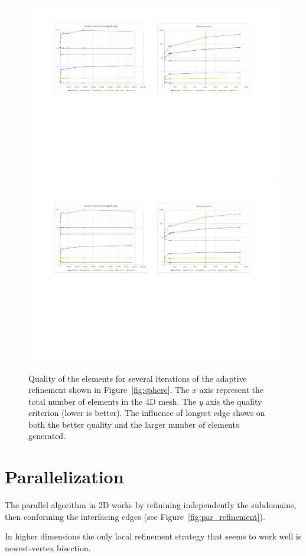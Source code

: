 \documentclass{article}
\begin{document}
\begin{figure}[htbp]
	\centering
	\includegraphics[width=0.48\linewidth]{figures/NewestVertex_Recursive} \hfill
	\includegraphics[width=0.48\linewidth]{figures/NewestVertex_and_LongestEdge_Recursive} 

	\caption{Quality of the elements for several iterations of the adaptive refinement shown in Figure~\ref{fig:sphere}. The $x$ axis represent the total number of elements in the 4D mesh. The $y$ axis the quality criterion (lower is better). The influence of longest edge shows on both the better quality and the larger number of elements generated.}
	\label{fig:quality}
\end{figure}


\section{Parallelization}

The parallel algorithm in 2D works by refinining independently the subdomains, then conforming the 
interfacing edges (see Figure~\ref{fig:par_refinement}). 



In higher dimensions the only local refinement strategy that seems to work well is newest-vertex bisection. 

\end{document}
